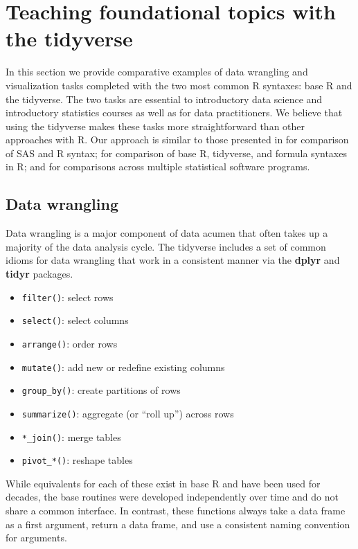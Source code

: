 \documentclass[12pt]{article}
\providecommand{\tightlist}{%
  \setlength{\itemsep}{0pt}\setlength{\parskip}{0pt}}
\begin{document}
\hypertarget{sec:tidyverse}{%
\section{Teaching foundational topics with the
tidyverse}\label{sec:tidyverse}}

In this section we provide comparative examples of data wrangling and
visualization tasks completed with the two most common R syntaxes: base
R and the tidyverse. The two tasks are essential to introductory data
science and introductory statistics courses as well as for data
practitioners. We believe that using the tidyverse makes these tasks
more straightforward than other approaches with R. Our approach is
similar to those presented in \citet{kleinman2009sas} for comparison of
SAS and R syntax; \citet{mcnamaraamelia2021} for comparison of base R,
tidyverse, and formula syntaxes in R; and \citet{dierker2021} for
comparisons across multiple statistical software programs.

\hypertarget{sec:wrangle}{%
\subsection{Data wrangling}\label{sec:wrangle}}

Data wrangling is a major component of data acumen \citep{nasem2018}
that often takes up a majority of the data analysis cycle. The tidyverse
includes a set of common idioms for data wrangling that work in a
consistent manner via the \textbf{dplyr} and \textbf{tidyr} packages.

\begin{itemize}
\tightlist
\item
  \texttt{filter()}: select rows
\item
  \texttt{select()}: select columns
\item
  \texttt{arrange()}: order rows
\item
  \texttt{mutate()}: add new or redefine existing columns
\item
  \texttt{group\_by()}: create partitions of rows
\item
  \texttt{summarize()}: aggregate (or ``roll up'') across rows
\item
  \texttt{*\_join()}: merge tables
\item
  \texttt{pivot\_*()}: reshape tables
\end{itemize}

While equivalents for each of these exist in base R and have been used
for decades, the base routines were developed independently over time
and do not share a common interface. In contrast, these functions always
take a data frame as a first argument, return a data frame, and use a
consistent naming convention for arguments.
\end{document}
